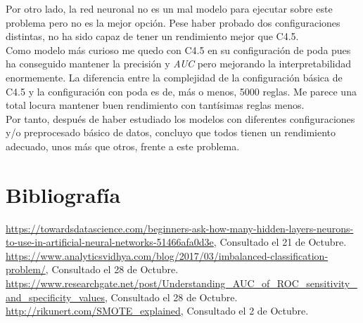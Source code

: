 \documentclass[paper=a4, fontsize=12pt]{article} %
\numberwithin{equation}{section} %
\numberwithin{figure}{section} %
\numberwithin{table}{section} %
\begin{document}
Por otro lado, la red neuronal no es un mal modelo para ejecutar sobre este problema pero no es la mejor opción. Pese haber probado dos configuraciones distintas, no ha sido capaz de tener un rendimiento mejor que C4.5. \\

Como modelo más curioso me quedo con C4.5 en su configuración de poda pues ha conseguido mantener la precisión y \textit{AUC} pero mejorando la interpretabilidad enormemente. La diferencia entre la complejidad de la configuración básica de C4.5 y la configuración con poda es de, más o menos, 5000 reglas. Me parece una total locura mantener buen rendimiento con tantísimas reglas menos. \\

Por tanto, después de haber estudiado los modelos con diferentes configuraciones y/o preprocesado básico de datos, concluyo que todos tienen un rendimiento adecuado, unos más que otros, frente a este problema.

\section{Bibliografía}

\begin{thebibliography}{0}
   \url {https://towardsdatascience.com/beginners-ask-how-many-hidden-layers-neurons-to-use-in-artificial-neural-networks-51466afa0d3e}, Consultado el 21 de Octubre.
   \url {https://www.analyticsvidhya.com/blog/2017/03/imbalanced-classification-problem/}, Consultado el 28 de Octubre.
   \url {https://www.researchgate.net/post/Understanding_AUC_of_ROC_sensitivity_and_specificity_values}, Consultado el 28 de Octubre.
   \url {http://rikunert.com/SMOTE_explained}, Consultado el 2 de Octubre.


\end{thebibliography}
\end{document}
